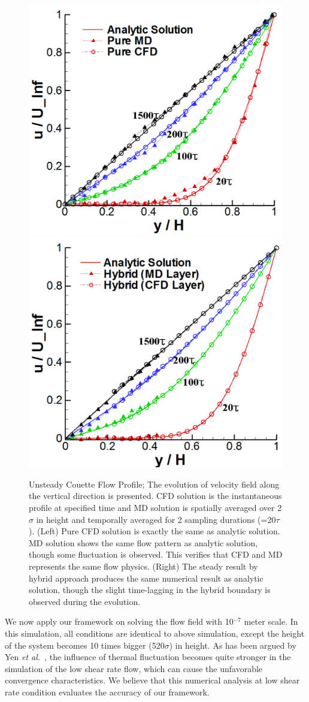 \documentclass[preprint,12pt]{elsarticle}
\begin{document}
\begin{figure}
\centering
\includegraphics[width=0.6\linewidth]{Flat_Plate_Sol1_New.pdf}
\hskip 1cm
\includegraphics[width=0.6\linewidth]{Flat_Plate_Sol2_New.pdf}
\vskip-0.2cm
\caption{\small Unsteady Couette Flow Profile; The evolution of velocity field along the vertical direction is presented. CFD solution is the instantaneous profile at specified time and MD solution is spatially averaged over 2 $\sigma$ in height and temporally averaged for 2 sampling durations (=20$\tau$). (Left) Pure CFD solution is exactly the same as analytic solution. MD solution shows the same flow pattern as analytic solution, though some fluctuation is observed. This verifies that CFD and MD represents the same flow physics. (Right) The steady result by hybrid approach produces the same numerical result as analytic solution, though the slight time-lagging in the hybrid boundary is observed during the evolution.}
\label{Flat_Plate_Sol}
\end{figure}


We now apply our framework on solving the flow field with 10$^{-7}$ meter scale. In this simulation, all conditions are identical to above simulation, except the height of the system becomes 10 times bigger (520$\sigma$) in height. As has been argued by Yen {\it{et al.}}~\cite{Yen}, the influence of thermal fluctuation becomes quite stronger in the simulation of the low shear rate flow, which can cause the unfavorable convergence characteristics. We believe that this numerical analysis at low shear rate condition evaluates the accuracy of our framework.
\end{document}
